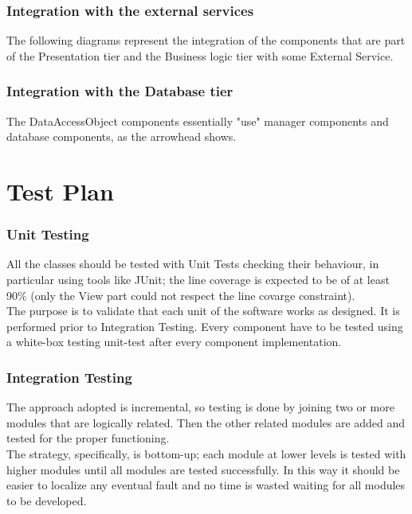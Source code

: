 \documentclass[../DD.tex]{subfiles}
\begin{document}
\subsubsection{Integration with the external services}
The following diagrams represent the integration of the components that are part of the Presentation tier and the Business logic tier with some External Service.


\subsubsection{Integration with the Database tier}
The DataAccessObject components essentially "use" manager components and database components, as the arrowhead shows.

\newpage

\section{Test Plan\label{5.4}}

\subsubsection{Unit Testing\label{5.4.1}}
All the classes should be tested with Unit Tests checking their behaviour, in particular using tools like JUnit; the line coverage is expected to be of at least 90\% (only the View part could not respect the line covarge constraint).\\

The purpose is to validate that each unit of the software works as designed. It is performed prior to Integration Testing. Every component have to be tested using a white-box testing unit-test after every component implementation.


\subsubsection{Integration Testing\label{5.4.2}}

The approach adopted is incremental, so testing is done by joining two or more modules that are logically related. Then the other related modules are added and tested for the proper functioning.\\

The strategy, specifically, is bottom-up; each module at lower levels is tested with higher modules until all modules are tested successfully. In this way it should be easier to localize any eventual fault and no time is wasted waiting for all modules to be developed.
\end{document}
